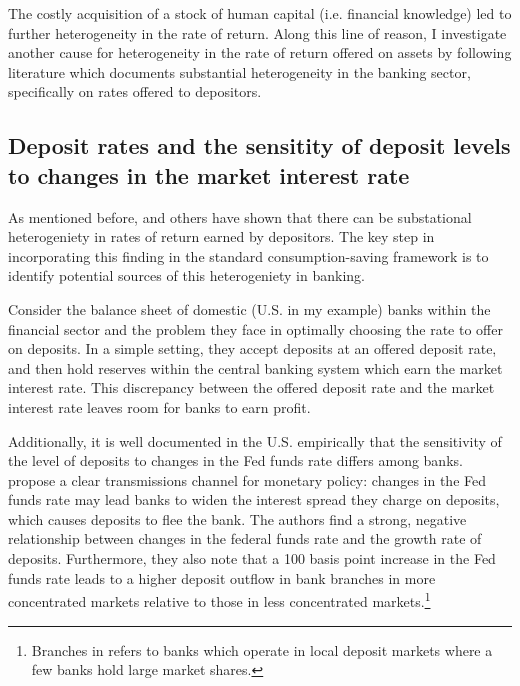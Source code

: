 \par The costly acquisition of a stock of human capital (i.e. financial knowledge) led to further heterogeneity in the rate of return. Along this line of reason, I investigate another cause for heterogeneity in the rate of return offered on assets by following literature which documents substantial heterogeneity in the banking sector, specifically on rates offered to depositors.

\subsection{Deposit rates and the sensitity of deposit levels to changes in the market interest rate}

\par As mentioned before, \cite{Deuflhard2018} and others have shown that there can be substational heterogeniety in rates of return earned by depositors. The key step in incorporating this finding in the standard consumption-saving framework is to identify potential sources of this heterogeniety in banking.

\par Consider the balance sheet of domestic (U.S. in my example) banks within the financial sector and the problem they face in optimally choosing the rate to offer on deposits. In a simple setting, they accept deposits at an offered deposit rate, and then hold reserves within the central banking system which earn the market interest rate. This discrepancy between the offered deposit rate and the market interest rate leaves room for banks to earn profit.

\par Additionally, it is well documented in the U.S. empirically that the sensitivity of the level of deposits to changes in the Fed funds rate differs among banks. \cite{Drechsler2017} propose a clear transmissions channel for monetary policy: changes in the Fed funds rate may lead banks to widen the interest spread they charge on deposits, which causes deposits to flee the bank. The authors find a strong, negative relationship between changes in the federal funds rate and the growth rate of deposits. Furthermore, they also note that a 100 basis point increase in the Fed funds rate leads to a higher deposit outflow in bank branches in more concentrated markets relative to those in less concentrated markets.\footnote{Branches in  refers to banks which operate in local deposit markets where a few banks hold large market shares.}

